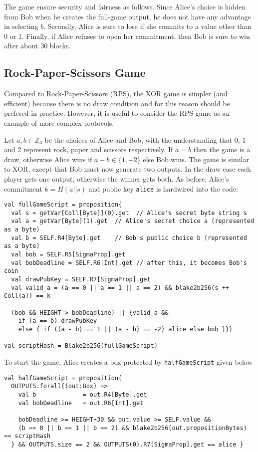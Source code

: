 \documentclass[11pt]{article}
\begin{document}
The game ensure security and fairness as follows. Since Alice's choice is hidden from Bob when he creates the full-game output, he does not have any advantage in selecting $b$. Secondly, Alice is sure to lose if she commits to a value other than 0 or 1. Finally, if Alice refuses to open her commitment, then Bob is sure to win after about 30 blocks. 
\subsection{Rock-Paper-Scissors Game}

Compared to Rock-Paper-Scissors (RPS), the XOR game is simpler (and efficient) because there is no draw condition and for this reason should be prefered in practice. However, it is useful to consider the RPS game as an example of more complex protocols.

Let $a, b\in \mathbb{Z}_3$ be the choices of Alice and Bob, with the understanding that 0, 1 and 2 represent rock, paper and scissors respectively. If $a = b$ then the game is a draw, otherwise Alice wins if $a-b \in \{1, -2\}$ else Bob wins. The game is similar to XOR, except that Bob must now generate two outputs. In the draw case each player gets one output, otherwise the winner gets both. 
As before, Alice's commitment $k=H(a||s)$ and public key \texttt{alice} is hardwired into the code:

\begin{verbatim}
val fullGameScript = proposition{
  val s = getVar[Coll[Byte]](0).get  // Alice's secret byte string s
  val a = getVar[Byte](1).get  // Alice's secret choice a (represented as a byte)
  val b = SELF.R4[Byte].get    // Bob's public choice b (represented as a byte)
  val bob = SELF.R5[SigmaProp].get
  val bobDeadline = SELF.R6[Int].get // after this, it becomes Bob's coin
  val drawPubKey = SELF.R7[SigmaProp].get
  val valid_a = (a == 0 || a == 1 || a == 2) && blake2b256(s ++ Coll(a)) == k

  (bob && HEIGHT > bobDeadline) || {valid_a &&
    if (a == b) drawPubKey
    else { if ((a - b) == 1 || (a - b) == -2) alice else bob }}}
    
val scriptHash = Blake2b256(fullGameScript)
\end{verbatim}

To start the game, Alice creates a box protected by \texttt{halfGameScript} given below

\begin{verbatim}
val halfGameScript = proposition{
  OUTPUTS.forall{(out:Box) =>
    val b             = out.R4[Byte].get
    val bobDeadline   = out.R6[Int].get

    bobDeadline >= HEIGHT+30 && out.value >= SELF.value &&
    (b == 0 || b == 1 || b == 2) && blake2b256(out.propositionBytes) == scriptHash
  } && OUTPUTS.size == 2 && OUTPUTS(0).R7[SigmaProp].get == alice }
\end{verbatim}
\end{document}
